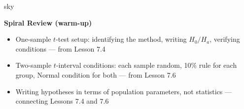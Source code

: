 \documentclass[10pt]{article}
\begin{document}
\begin{skillbox}{sky}
\begin{minipage}[t]{0.55\linewidth}\vspace{0pt}
    \textbf{Spiral Review (warm-up)}
    \begin{itemize}
        \item One-sample $t$-test setup: identifying the method, writing $H_0/H_a$,
              verifying conditions --- from Lesson 7.4
        \item Two-sample $t$-interval conditions: each sample random, 10\% rule for
              each group, Normal condition for both --- from Lesson 7.6
        \item Writing hypotheses in terms of population parameters, not statistics ---
              connecting Lessons 7.4 and 7.6
    \end{itemize}
\end{minipage}
\hfill
\begin{minipage}[t]{0.38\linewidth}\vspace{0pt}\centering
\end{minipage}
\end{skillbox}
\end{document}
